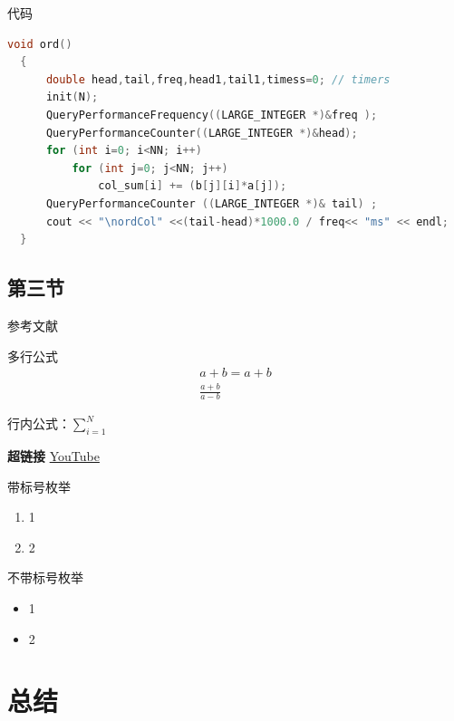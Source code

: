 \documentclass[UTF8,a4paper,10pt]{ctexart}
\newcommand{\xiaosi}{\fontsize{12pt}{18pt}\selectfont}            %
\begin{document}
代码
\begin{lstlisting}[title=逐列访问平凡算法,frame=trbl,language={C++}]
  void ord()   
  {
      double head,tail,freq,head1,tail1,timess=0; // timers
      init(N);
      QueryPerformanceFrequency((LARGE_INTEGER *)&freq );
      QueryPerformanceCounter((LARGE_INTEGER *)&head);
      for (int i=0; i<NN; i++)
          for (int j=0; j<NN; j++)
              col_sum[i] += (b[j][i]*a[j]);
      QueryPerformanceCounter ((LARGE_INTEGER *)& tail) ;
      cout << "\nordCol" <<(tail-head)*1000.0 / freq<< "ms" << endl;
  }
\end{lstlisting}


\subsection{第三节}

参考文献\cite{adams1995hitchhiker}\cite{shin2016deep}
    
多行公式
\begin{align}
  a+b = a + b \\
  \frac{a+b}{a-b}
\end{align}

行内公式：$\sum^N_{i=1}$

\textbf{超链接}  \href{http://youtube.com/}{YouTube}

带标号枚举
\begin{enumerate}
  \item 1
  \item 2
\end{enumerate}

不带标号枚举
\begin{itemize}
  \item 1
  \item 2
\end{itemize}

\xiaosi{切换字体大小}

\section{总结}

\newpage

 
\end{document}
